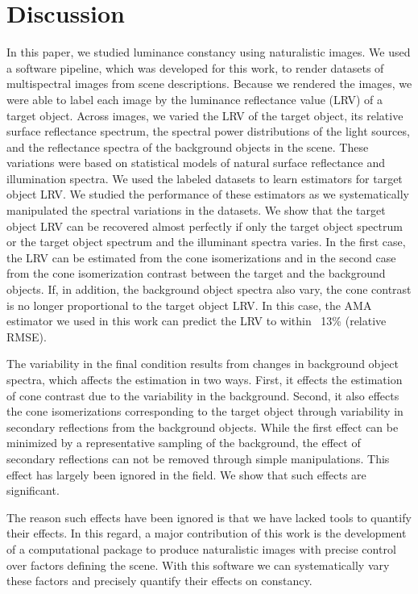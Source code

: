 \documentclass{jov}
\begin{document}
\section{Discussion} \label{Discussion}
In this paper, we studied luminance constancy using naturalistic images.
We used a software pipeline, which was developed for this work, to render datasets of multispectral images from scene descriptions.
Because we rendered the images, we were able to label each image by the luminance reflectance value (LRV) of a target object.
Across images, we varied the LRV of the target object, its relative surface reflectance spectrum, 
the spectral power distributions of the light sources, and the reflectance spectra of the background objects in the scene.
These variations were based on statistical models of natural surface reflectance and illumination spectra.
We used the labeled datasets to learn estimators for target object LRV.
We studied the performance of these estimators as we systematically manipulated the 
spectral variations in the datasets.
We show that the target object LRV can be recovered almost perfectly if only the target 
object spectrum or the target object spectrum and the illuminant spectra varies.
In the first case, the LRV can be estimated from the cone isomerizations and in the second case 
from the cone isomerization contrast between the target and the background objects.
If, in addition, the background object spectra also vary, the cone contrast is no longer 
proportional to the target object LRV.
In this case, the AMA estimator we used in this work can predict the LRV to within ~13\% (relative RMSE).

The variability in the final condition results from changes in background object spectra, which affects the estimation in two ways.
First, it effects the estimation of cone contrast due to the variability in the background.
Second, it also effects the cone isomerizations corresponding to the target object through 
variability in secondary reflections from the background objects.
While the first effect can be minimized by a representative sampling of the background, 
the effect of secondary reflections can not be removed through simple manipulations.
This effect has largely been ignored in the field. 
We show that such effects are significant.

The reason such effects have been ignored is that we have lacked tools to quantify their effects.
In this regard, a major contribution of this work is the development of a computational package to
produce naturalistic images with precise control over factors defining the scene.
With this software we can systematically vary these factors and precisely quantify their effects on constancy.
\end{document}
